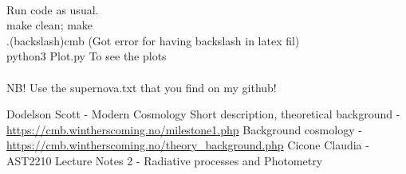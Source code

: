 \documentclass{article}
\begin{document}
\\
Run code as usual.\\
make clean; make\\
.(backslash)cmb         (Got error for having backslash in latex fil)  \\
python3 Plot.py         To see the plots\\
\\
NB! Use the supernova.txt that you find on my github!
\begin{thebibliography}{9}
    Dodelson Scott - Modern Cosmology 
	Short description, theoretical background - \url{https://cmb.wintherscoming.no/milestone1.php} 
	Background cosmology - \url{https://cmb.wintherscoming.no/theory_background.php} 
    Cicone Claudia - AST2210 Lecture Notes 2 - Radiative processes and Photometry 
\end{thebibliography}
\end{document}
